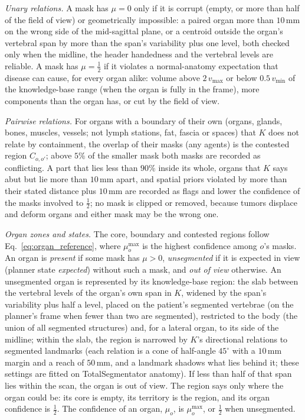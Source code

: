\documentclass[fleqn,10pt]{olplainarticle}
\begin{document}
\emph{Unary relations.} A mask has $\mu=0$ only if it is corrupt (empty, or more than half of the field of view) or
geometrically impossible: a paired organ more than $10$\,mm on the wrong side of the mid-sagittal plane, or a centroid
outside the organ's vertebral span by more than the span's variability plus one level, both checked only when the
midline, the header handedness and the vertebral levels are reliable. A mask has $\mu=\tfrac12$ if it violates a
normal-anatomy expectation that disease can cause, for every organ alike: volume above $2\,v_{\max}$ or below
$0.5\,v_{\min}$ of the knowledge-base range (when the organ is fully in the frame), more components than the organ has, or
cut by the field of view.

\emph{Pairwise relations.} For organs with a boundary of their own (organs, glands, bones, muscles, vessels; not lymph
stations, fat, fascia or spaces) that $K$ does not relate by containment, the overlap of their masks (any agents) is the
contested region $C_{o,o'}$; above $5\%$ of the smaller mask both masks are recorded as conflicting. A part that lies less
than $90\%$ inside its whole, organs that $K$ says abut but lie more than $10$\,mm apart, and spatial priors violated by more
than their stated distance plus $10$\,mm are recorded as flags and lower the confidence of the masks involved to
$\tfrac12$; no mask is clipped or removed, because tumors displace and deform organs and either mask may be the wrong one.

\emph{Organ zones and states.} The core, boundary and contested regions follow Eq.~\eqref{eq:organ_reference}, where
$\mu^{\max}_o$ is the highest confidence among $o$'s masks. An organ is \emph{present} if some mask has $\mu>0$,
\emph{unsegmented} if it is expected in view (planner state \emph{expected}) without such a mask, and \emph{out of view}
otherwise. An unsegmented organ is represented by its knowledge-base region: the slab between the vertebral levels of the
organ's own span in $K$, widened by the span's variability plus half a level, placed on the patient's segmented vertebrae
(on the planner's frame when fewer than two are segmented), restricted to the body (the union of all segmented structures)
and, for a lateral organ, to its side of the midline; within the slab, the region is narrowed by $K$'s directional
relations to segmented landmarks (each relation is a cone of half-angle $45^\circ$ with a $10$\,mm margin and a reach of
$50$\,mm, and a landmark shadows what lies behind it; these settings are fitted on TotalSegmentator anatomy). If less than half of that span lies within the scan, the organ is out of view. The region says only where
the organ could be: its core is empty, its territory is the region, and its organ confidence is $\tfrac12$. The confidence of an organ, $\mu_o$, is $\mu^{\max}_o$, or
$\tfrac12$ when unsegmented.
\end{document}
